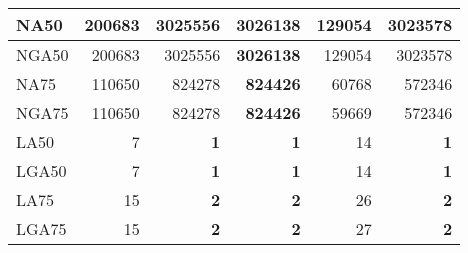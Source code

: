 \documentclass[12pt,a4paper]{article}
\begin{document}
\begin{table}[ht]
\begin{center}
\begin{tabular}{|l*{5}{|r}|}
NA50 & 200683 & 3025556 & {\bf 3026138} & 129054 & 3023578 \\ \hline
NGA50 & 200683 & 3025556 & {\bf 3026138} & 129054 & 3023578 \\ \hline
NA75 & 110650 & 824278 & {\bf 824426} & 60768 & 572346 \\ \hline
NGA75 & 110650 & 824278 & {\bf 824426} & 59669 & 572346 \\ \hline
LA50 & 7 & {\bf 1} & {\bf 1} & 14 & {\bf 1} \\ \hline
LGA50 & 7 & {\bf 1} & {\bf 1} & 14 & {\bf 1} \\ \hline
LA75 & 15 & {\bf 2} & {\bf 2} & 26 & {\bf 2} \\ \hline
LGA75 & 15 & {\bf 2} & {\bf 2} & 27 & {\bf 2} \\ \hline
\end{tabular}
\end{center}
\end{table}
\end{document}
